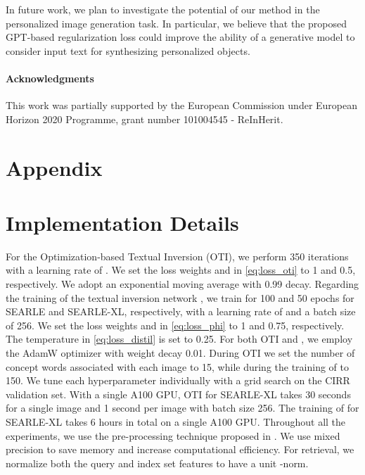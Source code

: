 \documentclass[10pt,twocolumn,letterpaper]{article}
\newcommand{\method}{SEARLE\xspace}
\begin{document}
In future work, we plan to investigate the potential of our method in the personalized image generation task. In particular, we believe that the proposed GPT-based regularization loss could improve the ability of a generative model to consider input text for synthesizing personalized objects.

\paragraph{Acknowledgments}
This work was partially supported by the European Commission under European Horizon 2020 Programme, grant number 101004545 - ReInHerit.

{\small


}


\clearpage
\appendix
\section*{Appendix}

\section{Implementation Details}
For the Optimization-based Textual Inversion (OTI), we perform 350 iterations with a learning rate of . We set the loss weights  and  in \cref{eq:loss_oti} to 1 and 0.5, respectively. We adopt an exponential moving average with 0.99 decay. Regarding the training of the textual inversion network , we train for 100 and 50 epochs for \method and \method-XL, respectively, with a learning rate of  and a batch size of 256. We set the loss weights  and  in \cref{eq:loss_phi} to 1 and 0.75, respectively. The temperature  in \cref{eq:loss_distil} is set to 0.25. For both OTI and , we employ the AdamW optimizer \cite{loshchilov2018decoupled} with weight decay 0.01. 
During OTI we set the number of concept words  associated with each image to 15, while during the training of  to 150. We tune each hyperparameter individually with a grid search on the CIRR validation set.
With a single A100 GPU, OTI for \method-XL takes 30 seconds for a single image and 1 second per image with batch size 256. The training of  for \method-XL takes 6 hours in total on a single A100 GPU. Throughout all the experiments, we use the pre-processing technique proposed in \cite{baldrati2022effective}. We use mixed precision to save memory and increase computational efficiency. For retrieval, we normalize both the query and index set features to have a unit -norm.
\end{document}
